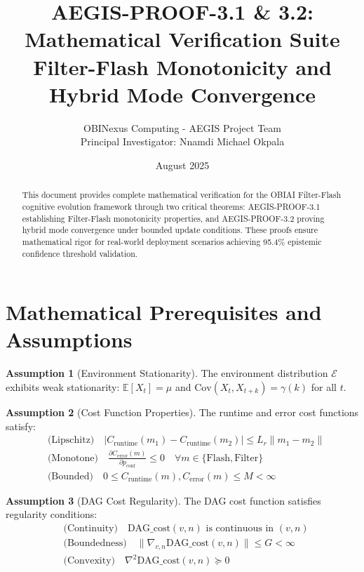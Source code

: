 \documentclass[11pt]{article}
\title{AEGIS-PROOF-3.1 \& 3.2: Mathematical Verification Suite \\
Filter-Flash Monotonicity and Hybrid Mode Convergence}
\author{OBINexus Computing - AEGIS Project Team \\
Principal Investigator: Nnamdi Michael Okpala}
\date{August 2025}
\theoremstyle{definition}
\newtheorem{assumption}{Assumption}
\begin{document}
\maketitle

\begin{abstract}
This document provides complete mathematical verification for the OBIAI Filter-Flash cognitive evolution framework through two critical theorems: AEGIS-PROOF-3.1 establishing Filter-Flash monotonicity properties, and AEGIS-PROOF-3.2 proving hybrid mode convergence under bounded update conditions. These proofs ensure mathematical rigor for real-world deployment scenarios achieving 95.4\% epistemic confidence threshold validation.
\end{abstract}

\section{Mathematical Prerequisites and Assumptions}

\begin{assumption}[Environment Stationarity]
\label{ass:stationarity}
The environment distribution $\mathcal{E}$ exhibits weak stationarity: $\mathbb{E}[X_t] = \mu$ and $\text{Cov}(X_t, X_{t+k}) = \gamma(k)$ for all $t$.
\end{assumption}

\begin{assumption}[Cost Function Properties]
\label{ass:cost_properties}
The runtime and error cost functions satisfy:
\begin{align}
&\text{(Lipschitz)} \quad |C_{\text{runtime}}(m_1) - C_{\text{runtime}}(m_2)| \leq L_r \|m_1 - m_2\| \\
&\text{(Monotone)} \quad \frac{\partial C_{\text{error}}(m)}{\partial p_{\text{conf}}} \leq 0 \quad \forall m \in \{\text{Flash}, \text{Filter}\} \\
&\text{(Bounded)} \quad 0 \leq C_{\text{runtime}}(m), C_{\text{error}}(m) \leq M < \infty
\end{align}
\end{assumption}

\begin{assumption}[DAG Cost Regularity]
\label{ass:dag_regularity}
The DAG cost function satisfies regularity conditions:
\begin{align}
&\text{(Continuity)} \quad \text{DAG\_cost}(v,n) \text{ is continuous in } (v,n) \\
&\text{(Boundedness)} \quad \|\nabla_{v,n} \text{DAG\_cost}(v,n)\| \leq G < \infty \\
&\text{(Convexity)} \quad \nabla^2 \text{DAG\_cost}(v,n) \succeq 0
\end{align}
\end{assumption}
\end{document}

